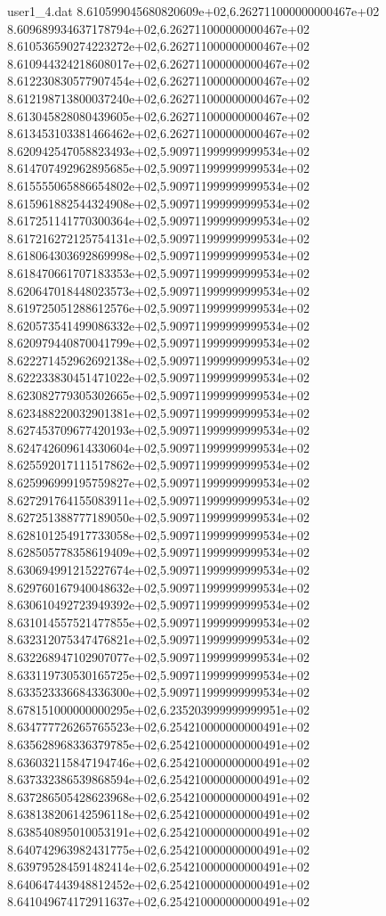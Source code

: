 \begin{filecontents}{user1_4.dat}
8.610599045680820609e+02,6.262711000000000467e+02
8.609689934637178794e+02,6.262711000000000467e+02
8.610536590274223272e+02,6.262711000000000467e+02
8.610944324218608017e+02,6.262711000000000467e+02
8.612230830577907454e+02,6.262711000000000467e+02
8.612198713800037240e+02,6.262711000000000467e+02
8.613045828080439605e+02,6.262711000000000467e+02
8.613453103381466462e+02,6.262711000000000467e+02
8.620942547058823493e+02,5.909711999999999534e+02
8.614707492962895685e+02,5.909711999999999534e+02
8.615555065886654802e+02,5.909711999999999534e+02
8.615961882544324908e+02,5.909711999999999534e+02
8.617251141770300364e+02,5.909711999999999534e+02
8.617216272125754131e+02,5.909711999999999534e+02
8.618064303692869998e+02,5.909711999999999534e+02
8.618470661707183353e+02,5.909711999999999534e+02
8.620647018448023573e+02,5.909711999999999534e+02
8.619725051288612576e+02,5.909711999999999534e+02
8.620573541499086332e+02,5.909711999999999534e+02
8.620979440870041799e+02,5.909711999999999534e+02
8.622271452962692138e+02,5.909711999999999534e+02
8.622233830451471022e+02,5.909711999999999534e+02
8.623082779305302665e+02,5.909711999999999534e+02
8.623488220032901381e+02,5.909711999999999534e+02
8.627453709677420193e+02,5.909711999999999534e+02
8.624742609614330604e+02,5.909711999999999534e+02
8.625592017111517862e+02,5.909711999999999534e+02
8.625996999195759827e+02,5.909711999999999534e+02
8.627291764155083911e+02,5.909711999999999534e+02
8.627251388777189050e+02,5.909711999999999534e+02
8.628101254917733058e+02,5.909711999999999534e+02
8.628505778358619409e+02,5.909711999999999534e+02
8.630694991215227674e+02,5.909711999999999534e+02
8.629760167940048632e+02,5.909711999999999534e+02
8.630610492723949392e+02,5.909711999999999534e+02
8.631014557521477855e+02,5.909711999999999534e+02
8.632312075347476821e+02,5.909711999999999534e+02
8.632268947102907077e+02,5.909711999999999534e+02
8.633119730530165725e+02,5.909711999999999534e+02
8.633523336684336300e+02,5.909711999999999534e+02
8.678151000000000295e+02,6.235203999999999951e+02
8.634777726265765523e+02,6.254210000000000491e+02
8.635628968336379785e+02,6.254210000000000491e+02
8.636032115847194746e+02,6.254210000000000491e+02
8.637332386539868594e+02,6.254210000000000491e+02
8.637286505428623968e+02,6.254210000000000491e+02
8.638138206142596118e+02,6.254210000000000491e+02
8.638540895010053191e+02,6.254210000000000491e+02
8.640742963982431775e+02,6.254210000000000491e+02
8.639795284591482414e+02,6.254210000000000491e+02
8.640647443948812452e+02,6.254210000000000491e+02
8.641049674172911637e+02,6.254210000000000491e+02

\end{filecontents}
